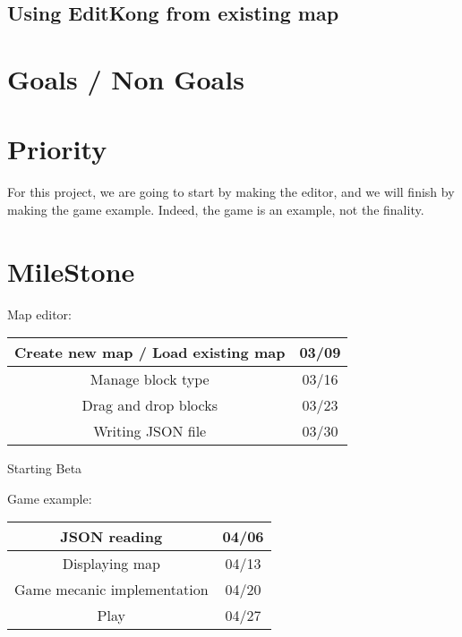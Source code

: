 \subsection{Using EditKong from existing map}

\section{Goals / Non Goals}
\section{Priority}
For this project, we are going to start by making the editor, and we will finish by making the game example. Indeed, the game is an example, not the finality.
\section{MileStone}
Map editor:
\begin{center}
\begin{tabular}{|*{2}{c|}}
    \hline
     Create new map / Load existing map & 03/09 \\
    \hline
     Manage block type & 03/16 \\
    \hline
	Drag and drop blocks & 03/23 \\ 
    \hline
     Writing JSON file & 03/30 \\
    \hline
\end{tabular}
\end{center}
Starting Beta

Game example:
\begin{center}
\begin{tabular}{|*{2}{c|}}
    \hline
    JSON reading & 04/06\\
    \hline
     Displaying map & 04/13 \\
    \hline
	Game mecanic implementation & 04/20 \\ 
    \hline
     Play & 04/27\\
    \hline
\end{tabular}
\end{center}